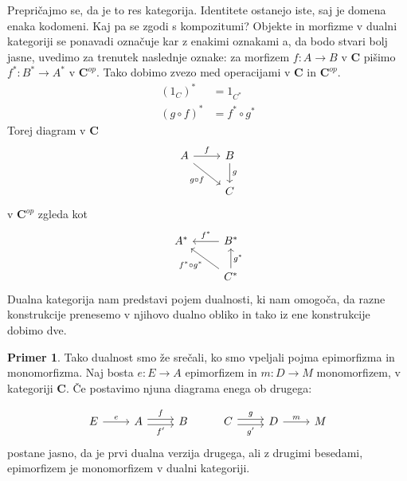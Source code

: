 \documentclass[12pt,a4paper]{book}
\theoremstyle{definition}
\theoremstyle{plain}
\theoremstyle{definition}
\newtheorem*{primer*}{Primer}
\theoremstyle{remark}
\newcommand{\cat}[1]{\textbf{#1}}
\begin{document}
Prepričajmo se, da je to res kategorija. Identitete ostanejo iste, saj je domena enaka kodomeni. Kaj pa se zgodi s kompozitumi? Objekte in morfizme v dualni kategoriji se ponavadi označuje kar z enakimi oznakami a, da bodo stvari bolj jasne, uvedimo za trenutek naslednje oznake: za morfizem $f : A \to B$ v $\cat{C}$ pišimo $f^* : B^* \to A^*$ v $\cat{C}^{op}$. Tako dobimo zvezo med operacijami v $\cat{C}$ in $\cat{C}^{op}$.
\begin{align*}
(1_C)^* &= 1_{C^*} \\
(g \circ f)^* &= f^* \circ g^*
\end{align*}
Torej diagram v $\cat{C}$
\[ \begin{tikzcd}
A \arrow[r, "f"] \arrow[rd, "g \circ f"'] & B \arrow[d, "g"] \\
&	C
\end{tikzcd} \]
%
v $\cat{C}^{op}$ zgleda kot
%
\[ \begin{tikzcd}
A^* & \arrow[l, "f^*"'] B^* \\
& \arrow[lu, "f^* \circ g^*"] C^* \arrow[u, "g^*"']
\end{tikzcd} \]
%
Dualna kategorija nam predstavi pojem dualnosti, ki nam omogoča, da razne konstrukcije prenesemo v njihovo dualno obliko in tako iz ene konstrukcije dobimo dve.

\begin{primer*}
Tako dualnost smo že srečali, ko smo vpeljali pojma epimorfizma in monomorfizma. Naj bosta $e : E \to A$ epimorfizem in $m : D \to M$ monomorfizem, v kategoriji $\cat{C}$. Če postavimo njuna diagrama enega ob drugega:

\[ \begin{tikzcd}
E \ar[r, "e"] & A \ar[r, shift left, "f"] \ar[r, shift right, "f'"'] & B & C \ar[r, shift left, "g"] \ar[r, shift right, "g'"'] & D \ar[r, "m"] & M
\end{tikzcd} \]
postane jasno, da je prvi dualna verzija drugega, ali z drugimi besedami, epimorfizem je monomorfizem v dualni kategoriji.
\end{primer*}
\end{document}
